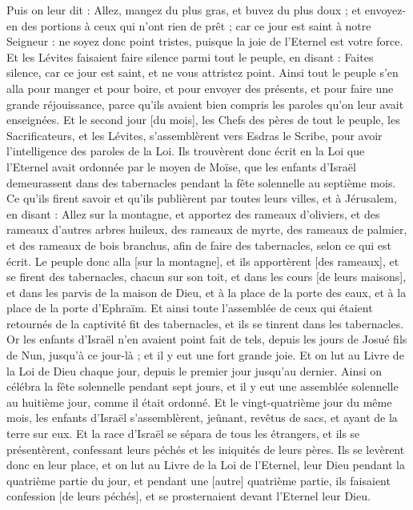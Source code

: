 \begin{multicols}{2}
Puis on leur dit : Allez, mangez du plus gras, et buvez du plus doux ; et envoyez-en des portions à ceux qui n'ont rien de prêt ; car ce jour est saint à notre Seigneur : ne soyez donc point tristes, puisque la joie de l'Eternel est votre force.
Et les Lévites faisaient faire silence parmi tout le peuple, en disant : Faites silence, car ce jour est saint, et ne vous attristez point.
Ainsi tout le peuple s'en alla pour manger et pour boire, et pour envoyer des présents, et pour faire une grande réjouissance, parce qu'ils avaient bien compris les paroles qu'on leur avait enseignées.
Et le second jour [du mois], les Chefs des pères de tout le peuple, les Sacrificateurs, et les Lévites, s'assemblèrent vers Esdras le Scribe, pour avoir l'intelligence des paroles de la Loi.
Ils trouvèrent donc écrit en la Loi que l'Eternel avait ordonnée par le moyen de Moïse, que les enfants d'Israël demeurassent dans des tabernacles pendant la fête solennelle au septième mois.
Ce qu'ils firent savoir et qu'ils publièrent par toutes leurs villes, et à Jérusalem, en disant : Allez sur la montagne, et apportez des rameaux d'oliviers, et des rameaux d'autres arbres huileux, des rameaux de myrte, des rameaux de palmier, et des rameaux de bois branchus, afin de faire des tabernacles, selon ce qui est écrit.
Le peuple donc alla [sur la montagne], et ils apportèrent [des rameaux], et se firent des tabernacles, chacun sur son toit, et dans les cours [de leurs maisons], et dans les parvis de la maison de Dieu, et à la place de la porte des eaux, et à la place de la porte d'Ephraïm.
Et ainsi toute l'assemblée de ceux qui étaient retournés de la captivité fit des tabernacles, et ils se tinrent dans les tabernacles. Or les enfants d'Israël n'en avaient point fait de tels, depuis les jours de Josué fils de Nun, jusqu'à ce jour-là ; et il y eut une fort grande joie.
Et on lut au Livre de la Loi de Dieu chaque jour, depuis le premier jour jusqu'au dernier. Ainsi on célébra la fête solennelle pendant sept jours, et il y eut une assemblée solennelle au huitième jour, comme il était ordonné.
\VerseOne{}Et le vingt-quatrième jour du même mois, les enfants d'Israël s'assemblèrent, jeûnant, revêtus de sacs, et ayant de la terre sur eux.
Et la race d'Israël se sépara de tous les étrangers, et ils se présentèrent, confessant leurs péchés et les iniquités de leurs pères.
Ils se levèrent donc en leur place, et on lut au Livre de la Loi de l'Eternel, leur Dieu pendant la quatrième partie du jour, et pendant une [autre] quatrième partie, ils faisaient confession [de leurs péchés], et se prosternaient devant l'Eternel leur Dieu.

\end{multicols}
